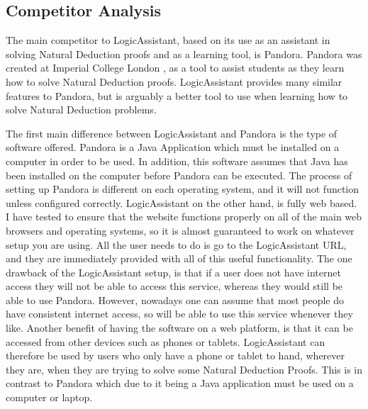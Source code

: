 \subsection{Competitor Analysis}

The main competitor to LogicAssistant, based on its use as an assistant in solving Natural Deduction proofs and as a learning tool, is Pandora. Pandora was created at Imperial College London \cite{pandora}, as a tool to assist students as they learn how to solve Natural Deduction proofs. LogicAssistant provides many similar features to Pandora, but is arguably a better tool to use when learning how to solve Natural Deduction problems.

The first main difference between LogicAssistant and Pandora is the type of software offered. Pandora is a Java Application which must be installed on a computer in order to be used. In addition, this software assumes that Java has been installed on the computer before Pandora can be executed. The process of setting up Pandora is different on each operating system, and it will not function unless configured correctly. LogicAssistant on the other hand, is fully web based. I have tested to ensure that the website functions properly on all of the main web browsers and operating systems, so it is almost guaranteed to work on whatever setup you are using. All the user needs to do is go to the LogicAssistant URL, and they are immediately provided with all of this useful functionality. The one drawback of the LogicAssistant setup, is that if a user does not have internet access they will not be able to access this service, whereas they would still be able to use Pandora. However, nowadays one can assume that most people do have consistent internet access, so will be able to use this service whenever they like. Another benefit of having the software on a web platform, is that it can be accessed from other devices such as phones or tablets. LogicAssistant can therefore be used by users who only have a phone or tablet to hand, wherever they are, when they are trying to solve some Natural Deduction Proofs. This is in contrast to Pandora which due to it being a Java application must be used on a computer or laptop.

